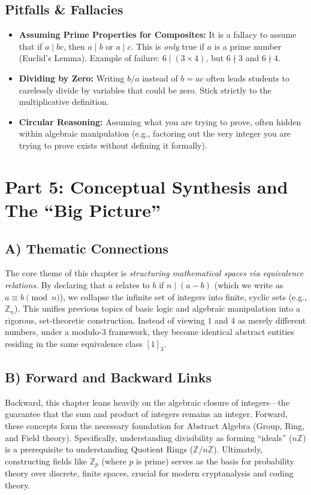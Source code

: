\documentclass[11pt]{article}
\theoremstyle{definition}
\theoremstyle{remark}
\begin{document}
\subsection{Pitfalls \& Fallacies}
\begin{itemize}
    \item \textbf{Assuming Prime Properties for Composites:} It is a fallacy to assume that if $a \mid bc$, then $a \mid b$ or $a \mid c$. This is \textit{only} true if $a$ is a prime number (Euclid's Lemma). Example of failure: $6 \mid (3 \times 4)$, but $6 \nmid 3$ and $6 \nmid 4$.
    \item \textbf{Dividing by Zero:} Writing $b/a$ instead of $b=ac$ often leads students to carelessly divide by variables that could be zero. Stick strictly to the multiplicative definition.
    \item \textbf{Circular Reasoning:} Assuming what you are trying to prove, often hidden within algebraic manipulation (e.g., factoring out the very integer you are trying to prove exists without defining it formally).
\end{itemize}

\newpage
\section{Part 5: Conceptual Synthesis and The ``Big Picture''}

\subsection{A) Thematic Connections}
The core theme of this chapter is \textit{structuring mathematical spaces via equivalence relations}. By declaring that $a$ relates to $b$ if $n \mid (a - b)$ (which we write as $a \equiv b \pmod n$), we collapse the infinite set of integers into finite, cyclic sets (e.g., $\mathbb{Z}_n$). This unifies previous topics of basic logic and algebraic manipulation into a rigorous, set-theoretic construction. Instead of viewing $1$ and $4$ as merely different numbers, under a modulo-3 framework, they become identical abstract entities residing in the same equivalence class $[1]_3$.

\subsection{B) Forward and Backward Links}
Backward, this chapter leans heavily on the algebraic closure of integers—the guarantee that the sum and product of integers remains an integer. Forward, these concepts form the necessary foundation for Abstract Algebra (Group, Ring, and Field theory). Specifically, understanding divisibility as forming ``ideals'' ($n\mathbb{Z}$) is a prerequisite to understanding Quotient Rings ($\mathbb{Z}/n\mathbb{Z}$). Ultimately, constructing fields like $\mathbb{Z}_p$ (where $p$ is prime) serves as the basis for probability theory over discrete, finite spaces, crucial for modern cryptanalysis and coding theory.
\end{document}

